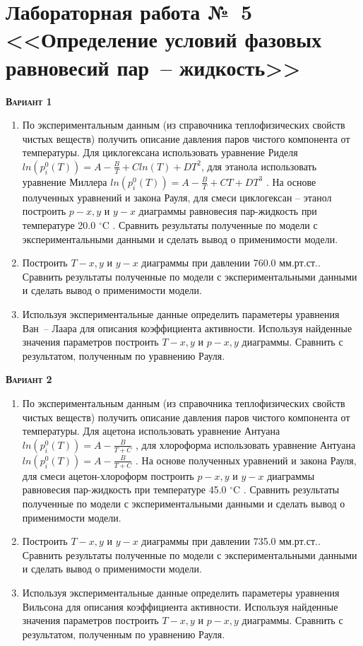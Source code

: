 \section{Лабораторная работа №~5 <<Определение условий фазовых равновесий пар~-- жидкость>>}

 \addtocounter{nlab}{1}\textsc{\textbf{Вариант 1}}
\begin{enumerate}
\item По экспериментальным данным (из справочника теплофизических свойств чистых веществ) получить описание давления паров чистого компонента от температуры. Для циклогексана использовать уравнение Риделя $ln(p_i^0(T))=A-\frac{B}{T}+C ln(T)+DT^2$, для этанола использовать уравнение Миллера $ln(p_i^0(T))=A-\frac{B}{T}+C T+DT^3$  . На основе полученных уравнений и закона Рауля, для смеси циклогексан -- этанол построить $p-x,y$ и $y-x$ диаграммы равновесия пар-жидкость при температуре   20.0 $^\circ$C . Сравнить результаты полученные по модели с экспериментальными данными и сделать вывод о применимости модели.

\item Построить $T-x,y$ и $y-x$ диаграммы при давлении  760.0 мм.рт.ст.. Сравнить результаты полученные по модели с экспериментальными данными и сделать вывод о применимости модели. \item Используя экспериментальные данные определить параметеры уравнения Ван~-- Лаара для описания коэффициента активности. Используя найденные значения параметров построить $T-x,y$ и $p-x,y$ диаграммы. Сравнить с результатом, полученным по уравнению Рауля.\end{enumerate}

\textsc{\textbf{Вариант 2}}
\begin{enumerate}
\item По экспериментальным данным (из справочника теплофизических свойств чистых веществ) получить описание давления паров чистого компонента от температуры. Для ацетона использовать уравнение Антуана $ln(p_i^0(T))=A-\frac{B}{T+C}$         , для хлороформа использовать уравнение Антуана $ln(p_i^0(T))=A-\frac{B}{T+C}$         . На основе полученных уравнений и закона Рауля, для смеси ацетон-хлороформ построить $p-x,y$ и $y-x$ диаграммы равновесия пар-жидкость при температуре   45.0 $^\circ$C . Сравнить результаты полученные по модели с экспериментальными данными и сделать вывод о применимости модели.

\item Построить $T-x,y$ и $y-x$ диаграммы при давлении  735.0 мм.рт.ст.. Сравнить результаты полученные по модели с экспериментальными данными и сделать вывод о применимости модели. \item Используя экспериментальные данные определить параметеры уравнения Вильсона     для описания коэффициента активности. Используя найденные значения параметров построить $T-x,y$ и $p-x,y$ диаграммы. Сравнить с результатом, полученным по уравнению Рауля.\end{enumerate}

